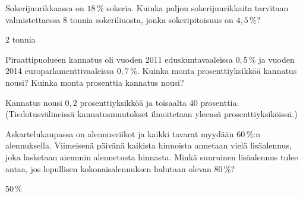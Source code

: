 \begin{tehtavasivu}
\begin{tehtava}
    Sokerijuurikkaassa on $18\,\%$ sokeria. Kuinka paljon sokerijuurikkaita tarvitaan valmistettaessa $8$ tonnia sokeriliuosta, jonka sokeripitoisuus on $4,5\,\%$?
    \begin{vastaus}
        $2$ tonnia
    \end{vastaus}
\end{tehtava}

\begin{tehtava}
    Piraattipuolueen kannatus oli vuoden 2011 eduskuntavaaleissa $0,5\,\%$ ja vuoden 2014 europarlamenttivaaleissa $0,7\,\%$. Kuinka monta prosenttiyksikköä kannatus nousi? Kuinka monta prosenttia kannatus nousi?
    \begin{vastaus}
        Kannatus nousi $0,2$ prosenttiyksikköä ja toisaalta $40$ prosenttia. (Tiedotusvälineissä kannatusmuutokset ilmoitetaan yleensä prosenttiyksiköissä.)
    \end{vastaus}
\end{tehtava}

\begin{tehtava}
    Askartelukaupassa on alennusviikot ja kaikki tavarat myydään $60\,\%$:n alennuksella. Viimeisenä päivänä kaikista hinnoista annetaan vielä lisäalennus, joka lasketaan aiemmin alennetusta hinnasta. Minkä suuruinen lisäalennus tulee antaa, jos lopullisen kokonaisalennuksen halutaan olevan $80\,\%$?
    \begin{vastaus}
        $50\,\%$
    \end{vastaus}
\end{tehtava}


\end{tehtavasivu}

